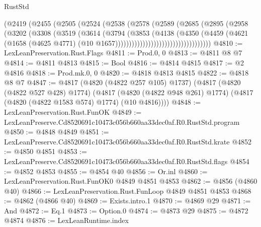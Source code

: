 \begin{lexlean}{RustStd}
\begin{coremodule}
                              (@2419
                                (@2455
                                  (@2505
                                    (@2524
                                      (@2538
                                        (@2578
                                          (@2589
                                            (@2685
                                              (@2895
                                                (@2958
                                                  (@3202
                                                    (@3308
                                                      (@3519
                                                        (@3614
                                                          (@3794
                                                            (@3853
                                                              (@4138
                                                                (@4350
                                                                  (@4459
                                                                    (@4621
                                                                      (@1658
                                                                        (@4625 @4771)
                                                                        (@10
                                                                          @1657)))))))))))))))))))))))))))))))))))
@4810 := LexLeanPreservation.Rust.Flags
@4811 := Prod.{0, 0}
@4813 := @4811 @8 @7
@4814 := @4811 @4813
@4815 := Bool
@4816 := @4814 @4815
@4817 := @2 @4816
@4818 := Prod.mk.{0, 0}
@4820 := @4818 @4813 @4815
@4822 := @4818 @8 @7
@4847 := @4817
    (@4820 (@4822 @257 @105) @1737)
    (@4817
      (@4820 (@4822 @527 @428) @1774)
      (@4817 (@4820 (@4822 @948 @261) @1774) (@4817 (@4820 (@4822 @1583 @574) @1774) (@10 @4816))))
@4848 := LexLeanPreservation.Rust.FunOK
@4849 := LexLeanPreserve.Cd8520691c10473c056b660aa33dec0af.R0.RustStd.program
@4850 := @4848 @4849
@4851 := LexLeanPreserve.Cd8520691c10473c056b660aa33dec0af.R0.RustStd.krate
@4852 := @4850 @4851
@4853 := LexLeanPreserve.Cd8520691c10473c056b660aa33dec0af.R0.RustStd.flags
@4854 := @4852 @4853
@4855 := @4854 @40
@4856 := Or.inl
@4860 := LexLeanPreservation.Rust.FunOK0 @4849 @4851 @4853
@4862 := @4856 (@4860 @40)
@4866 := LexLeanPreservation.Rust.FunLoop @4849 @4851 @4853
@4868 := @4862 (@4866 @40)
@4869 := Exists.intro.{1}
@4870 := @4869 @29
@4871 := And
@4872 := Eq.{1}
@4873 := Option.{0}
@4874 := @4873 @29
@4875 := @4872 @4874
@4876 := LexLeanRuntime.index

\end{coremodule}
\end{lexlean}
